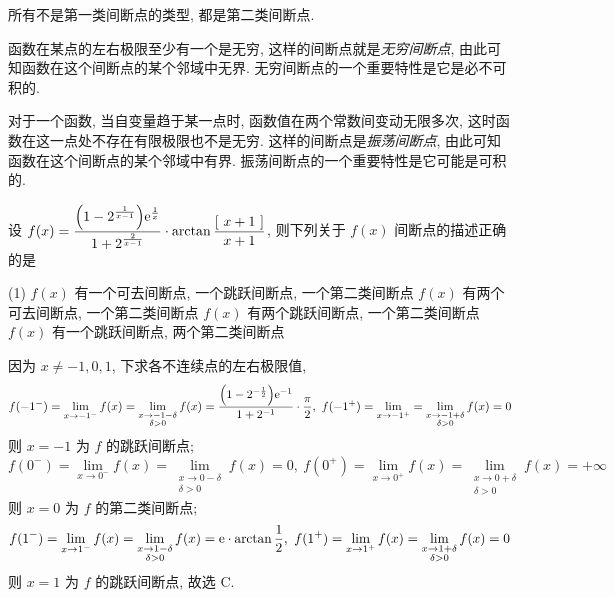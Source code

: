 所有不是第一类间断点的类型, 都是第二类间断点.

\begin{definition}[无穷间断点]
    函数在某点的左右极限至少有一个是无穷, 这样的间断点就是\textit{无穷间断点}, 由此可知函数在这个间断点的某个邻域中无界. 无穷间断点的一个重要特性是它是必不可积的.
\end{definition}

\begin{definition}[振荡间断点]
    对于一个函数, 当自变量趋于某一点时, 函数值在两个常数间变动无限多次, 这时函数在这一点处不存在有限极限也不是无穷.
    这样的间断点是\textit{振荡间断点}, 由此可知函数在这个间断点的某个邻域中有界. 振荡间断点的一个重要特性是它可能是可积的.
\end{definition}

\begin{example}
    设 $f(x)=\dfrac{\qty(1-2^{\frac{1}{x-1}})\mathrm{e}^{\frac{1}{x}}}{1+2^{\frac{2}{x-1}}}\cdot\arctan\dfrac{[~x+1~]}{x+1}$, 则下列关于 $f(x)$ 间断点的描述正确的是
    \begin{tasks}(1)
        \task $f(x)$ 有一个可去间断点, 一个跳跃间断点, 一个第二类间断点
        \task $f(x)$ 有两个可去间断点, 一个第二类间断点
        \task $f(x)$ 有两个跳跃间断点, 一个第二类间断点
        \task $f(x)$ 有一个跳跃间断点, 两个第二类间断点
    \end{tasks}
\end{example}
\begin{solution}
    因为 $x\neq-1,0,1$, 下求各不连续点的左右极限值, 
    $$f(-1^-)=\lim_{x\to-1^-}f(x)=\lim_{\substack{x\to-1-\delta\\\delta>0}}f(x)=\dfrac{\qty(1-2^{-\frac{1}{2}})\mathrm{e}^{-1}}{1+2^{-1}}\cdot\dfrac{\pi}{2},~f(-1^+)=\lim_{x\to-1^+}=\lim_{\substack{x\to-1+\delta\\\delta>0}}f(x)=0$$
    则 $x=-1$ 为 $f$ 的跳跃间断点;
    $$f(0^-)=\lim_{x\to0^-}f(x)=\lim_{\substack{x\to0-\delta\\\delta>0}}f(x)=0,~f(0^+)=\lim_{x\to0^+}f(x)=\lim_{\substack{x\to0+\delta\\\delta>0}}f(x)=+\infty$$
    则 $x=0$ 为 $f$ 的第二类间断点;
    $$f(1^-)=\lim_{x\to1^-}f(x)=\lim_{\substack{x\to1-\delta\\\delta>0}}f(x)=\mathrm{e}\cdot\arctan\dfrac{1}{2},~f(1^+)=\lim_{x\to1^+}f(x)=\lim_{\substack{x\to1+\delta\\\delta>0}}f(x)=0$$
    则 $x=1$ 为 $f$ 的跳跃间断点, 故选 C.
\end{solution}

